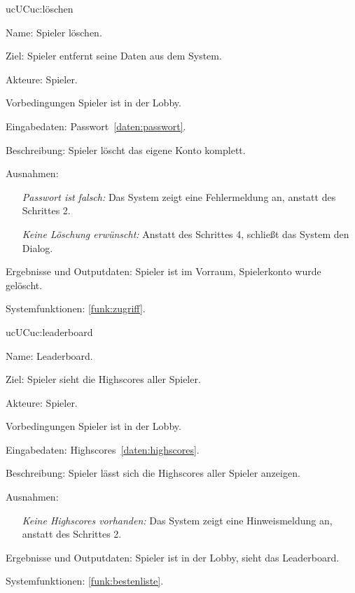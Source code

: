 \begin{description}[leftmargin=5em, style=sameline]
	\begin{lhp}{uc}{UC}{uc:löschen}
		\item [Name:] Spieler löschen.
		\item [Ziel:] Spieler entfernt seine Daten aus dem System.
		\item [Akteure:] Spieler.
		\item [Vorbedingungen] Spieler ist in der Lobby.
		\item [Eingabedaten:] Passwort~\ref{daten:passwort}.
		\item [Beschreibung:] Spieler löscht das eigene Konto komplett.
		\item [Ausnahmen:] \hfill
			\begin{itemize} 
				\item[] \textit{Passwort ist falsch:} Das System zeigt eine Fehlermeldung an, anstatt des Schrittes 2.
				\item[] \textit{Keine Löschung erwünscht:} Anstatt des Schrittes 4, schließt das System den Dialog.
				
			\end{itemize}
		\item [Ergebnisse und Outputdaten:] Spieler ist im Vorraum, Spielerkonto wurde gelöscht.	
		\item [Systemfunktionen:] \ref{funk:zugriff}.
	\end{lhp}
	
	\begin{lhp}{uc}{UC}{uc:leaderboard}
		\item [Name:] Leaderboard.
		\item [Ziel:]Spieler sieht die Highscores aller Spieler.
		\item [Akteure:] Spieler.
		\item [Vorbedingungen] Spieler ist in der Lobby.
		\item [Eingabedaten:] Highscores~\ref{daten:highscores}.
		\item [Beschreibung:] Spieler lässt sich die Highscores aller Spieler anzeigen.
		\item [Ausnahmen:] \hfill
			\begin{itemize} 
				\item[] \textit{Keine Highscores vorhanden:} Das System zeigt eine Hinweismeldung an, anstatt des Schrittes 2.
				
			\end{itemize}
		\item [Ergebnisse und Outputdaten:] Spieler ist in der Lobby, sieht das Leaderboard.	
		\item [Systemfunktionen:] \ref{funk:bestenliste}.
	\end{lhp}
	

\end{description}
